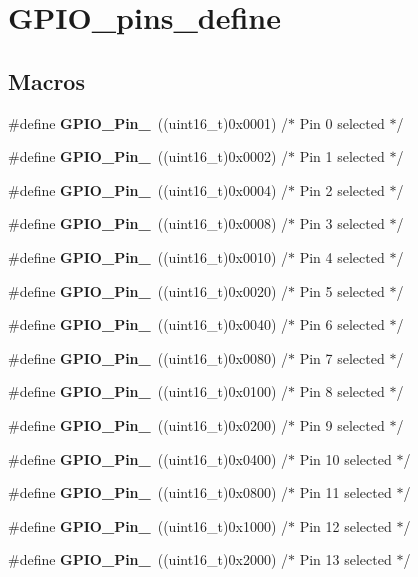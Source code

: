 \section{G\+P\+I\+O\+\_\+pins\+\_\+define}
\label{group__GPIO__pins__define}
\subsection*{Macros}
\begin{DoxyCompactItemize}
\item 
\#define \textbf{ G\+P\+I\+O\+\_\+\+Pin\+\_}~((uint16\+\_\+t)0x0001)  /$\ast$ Pin 0 selected $\ast$/
\item 
\#define \textbf{ G\+P\+I\+O\+\_\+\+Pin\+\_}~((uint16\+\_\+t)0x0002)  /$\ast$ Pin 1 selected $\ast$/
\item 
\#define \textbf{ G\+P\+I\+O\+\_\+\+Pin\+\_}~((uint16\+\_\+t)0x0004)  /$\ast$ Pin 2 selected $\ast$/
\item 
\#define \textbf{ G\+P\+I\+O\+\_\+\+Pin\+\_}~((uint16\+\_\+t)0x0008)  /$\ast$ Pin 3 selected $\ast$/
\item 
\#define \textbf{ G\+P\+I\+O\+\_\+\+Pin\+\_}~((uint16\+\_\+t)0x0010)  /$\ast$ Pin 4 selected $\ast$/
\item 
\#define \textbf{ G\+P\+I\+O\+\_\+\+Pin\+\_}~((uint16\+\_\+t)0x0020)  /$\ast$ Pin 5 selected $\ast$/
\item 
\#define \textbf{ G\+P\+I\+O\+\_\+\+Pin\+\_}~((uint16\+\_\+t)0x0040)  /$\ast$ Pin 6 selected $\ast$/
\item 
\#define \textbf{ G\+P\+I\+O\+\_\+\+Pin\+\_}~((uint16\+\_\+t)0x0080)  /$\ast$ Pin 7 selected $\ast$/
\item 
\#define \textbf{ G\+P\+I\+O\+\_\+\+Pin\+\_}~((uint16\+\_\+t)0x0100)  /$\ast$ Pin 8 selected $\ast$/
\item 
\#define \textbf{ G\+P\+I\+O\+\_\+\+Pin\+\_}~((uint16\+\_\+t)0x0200)  /$\ast$ Pin 9 selected $\ast$/
\item 
\#define \textbf{ G\+P\+I\+O\+\_\+\+Pin\+\_}~((uint16\+\_\+t)0x0400)  /$\ast$ Pin 10 selected $\ast$/
\item 
\#define \textbf{ G\+P\+I\+O\+\_\+\+Pin\+\_}~((uint16\+\_\+t)0x0800)  /$\ast$ Pin 11 selected $\ast$/
\item 
\#define \textbf{ G\+P\+I\+O\+\_\+\+Pin\+\_}~((uint16\+\_\+t)0x1000)  /$\ast$ Pin 12 selected $\ast$/
\item 
\#define \textbf{ G\+P\+I\+O\+\_\+\+Pin\+\_}~((uint16\+\_\+t)0x2000)  /$\ast$ Pin 13 selected $\ast$/

\end{DoxyCompactItemize}
